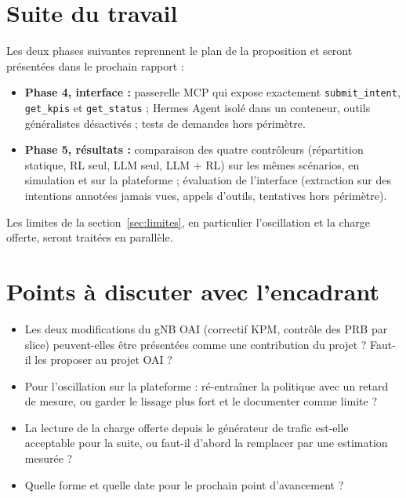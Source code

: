 \documentclass[11pt,a4paper]{article}
\newcommand{\tool}[1]{\texttt{#1}}
\begin{document}
\section{Suite du travail}

Les deux phases suivantes reprennent le plan de la proposition et seront présentées dans le
prochain rapport :
\begin{itemize}
  \item \textbf{Phase 4, interface :} passerelle MCP qui expose exactement
        \tool{submit\_intent}, \tool{get\_kpis} et \tool{get\_status} ; Hermes Agent isolé dans
        un conteneur, outils généralistes désactivés ; tests de demandes hors périmètre.
  \item \textbf{Phase 5, résultats :} comparaison des quatre contrôleurs (répartition statique,
        RL seul, LLM seul, LLM + RL) sur les mêmes scénarios, en simulation et sur la plateforme ;
        évaluation de l'interface (extraction sur des intentions annotées jamais vues, appels
        d'outils, tentatives hors périmètre).
\end{itemize}
Les limites de la section~\ref{sec:limites}, en particulier l'oscillation et la charge offerte,
seront traitées en parallèle.

\section{Points à discuter avec l'encadrant}

\begin{itemize}
  \item Les deux modifications du gNB OAI (correctif KPM, contrôle des PRB par slice) peuvent-elles
        être présentées comme une contribution du projet ? Faut-il les proposer au projet OAI ?
  \item Pour l'oscillation sur la plateforme : ré-entraîner la politique avec un retard de mesure,
        ou garder le lissage plus fort et le documenter comme limite ?
  \item La lecture de la charge offerte depuis le générateur de trafic est-elle acceptable pour la
        suite, ou faut-il d'abord la remplacer par une estimation mesurée ?
  \item Quelle forme et quelle date pour le prochain point d'avancement ?
\end{itemize}
\end{document}
